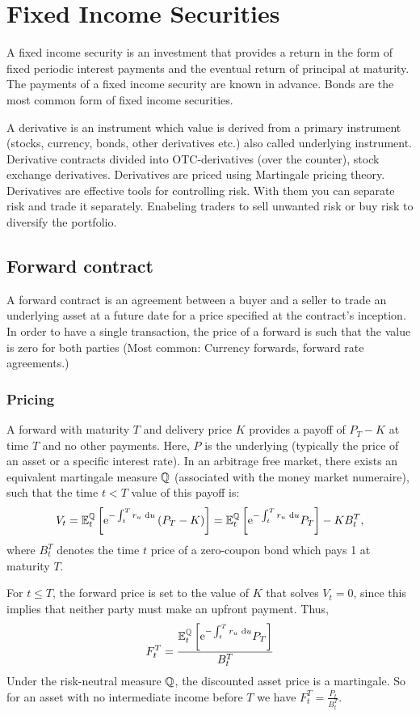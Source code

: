 \chapter{Fixed Income Securities}
A fixed income security is an investment that provides a return in the form of fixed periodic
interest payments and the eventual return of principal at maturity. The payments of a fixed income
security are known in advance. Bonds are the most common form of fixed income securities.

A derivative is an instrument which value is derived from a primary instrument (stocks, currency,
bonds, other derivatives etc.) also called underlying instrument. Derivative contracts divided into
OTC-derivatives (over the counter), stock exchange derivatives. Derivatives are priced using
Martingale pricing theory. Derivatives are effective tools for controlling risk. With them you can
separate risk and trade it separately. Enabeling traders to sell unwanted risk or buy risk to
diversify the portfolio.

\section{Forward contract}
A forward contract is an agreement between a buyer and a seller to trade an underlying asset at a
future date for a price specified at the contract's inception. In order to have a single
transaction, the price of a forward is such that the value is zero for both parties (Most common:
Currency forwards, forward rate agreements.)

\subsection{Pricing}
A forward with maturity $T$ and delivery price $K$ provides a payoff of $P_{T}-K$ at time $T$ and no
other payments. Here, $P$ is the underlying (typically the price of an asset or a specific interest
rate). In an arbitrage free market, there exists an equivalent martingale measure $\mathbb{Q}$ (associated with the money market numeraire), such that the time $t<T$ value of this payoff is:
\[
V_{t}=\mathbb{E}_{t}^{\mathbb{Q}}\left[\mathrm{e}^{-\int_{t}^{T} r_{u} \text{ d} 
u}\left(P_{T}-K\right)\right]=\mathbb{E}_{t}^{\mathbb{Q}}\left[\mathrm{e}^{-\int_{t}^{T} r_{u} \text{ d} 
u} P_{T}\right]-K B_{t}^{T}
,\]
where $B_t^{T}$ denotes the time $t$ price of a zero-coupon bond which pays 1 at maturity $T$. 

For $t \le T$, the forward price is set to the value of $K$ that solves $V_{t}=0$, since this
implies that neither party must make an upfront payment. Thus,
\[
F_{t}^{T}=\frac{\mathbb{E}_{t}^{\mathbb{Q}}\left[\mathrm{e}^{-\int_{t}^{T} r_{u} \text{ d}  u} P_{T}\right]}{B_{t}^{T}}
\]
Under the risk-neutral measure $\mathbb{Q}$, the discounted asset price is a martingale.
So for an asset with no intermediate income before $T$ we have $F_{t}^{T}=\frac{P_{t}}{B_{t}^{T}}$.

